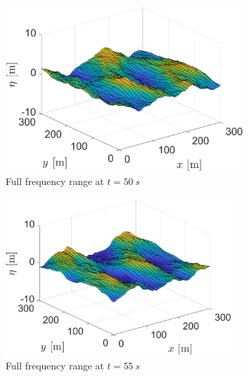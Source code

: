 \begin{figure}[htb]
\begin{subfigure}[t]{.5\textwidth}
    \centering
    \includegraphics[width=.95\textwidth,trim=0cm 0cm 0.0cm 0cm, clip=true]{Figures/Plots/etadirns1.eps}
    \caption{Full frequency range at $t=\SI{50}{s}$}
    \label{fig:etaIFFTdirns1}
\end{subfigure}%
\begin{subfigure}[t]{.5\textwidth}
    \centering
    \includegraphics[width=0.95\textwidth,trim=0cm 0cm 0cm 0cm, clip=true]{Figures/Plots/etadirns2.eps}
    \caption{Full frequency range at $t=\SI{55}{s}$}
    \label{fig:etaIFFTdirns2}
\end{subfigure}
\begin{subfigure}[t]{.5\textwidth}
    \centering

\end{subfigure}
\end{figure}
